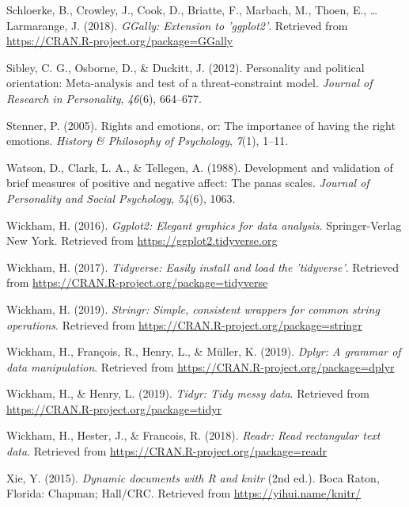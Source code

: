 \documentclass[man]{apa6}
\begin{document}
\leavevmode\hypertarget{ref-R-GGally}{}%
Schloerke, B., Crowley, J., Cook, D., Briatte, F., Marbach, M., Thoen, E., \ldots{} Larmarange, J. (2018). \emph{GGally: Extension to 'ggplot2'}. Retrieved from \url{https://CRAN.R-project.org/package=GGally}

\leavevmode\hypertarget{ref-sibley2012personality}{}%
Sibley, C. G., Osborne, D., \& Duckitt, J. (2012). Personality and political orientation: Meta-analysis and test of a threat-constraint model. \emph{Journal of Research in Personality}, \emph{46}(6), 664--677.

\leavevmode\hypertarget{ref-stenner2005rights}{}%
Stenner, P. (2005). Rights and emotions, or: The importance of having the right emotions. \emph{History \& Philosophy of Psychology}, \emph{7}(1), 1--11.

\leavevmode\hypertarget{ref-watson1988development}{}%
Watson, D., Clark, L. A., \& Tellegen, A. (1988). Development and validation of brief measures of positive and negative affect: The panas scales. \emph{Journal of Personality and Social Psychology}, \emph{54}(6), 1063.

\leavevmode\hypertarget{ref-R-ggplot2}{}%
Wickham, H. (2016). \emph{Ggplot2: Elegant graphics for data analysis}. Springer-Verlag New York. Retrieved from \url{https://ggplot2.tidyverse.org}

\leavevmode\hypertarget{ref-R-tidyverse}{}%
Wickham, H. (2017). \emph{Tidyverse: Easily install and load the 'tidyverse'}. Retrieved from \url{https://CRAN.R-project.org/package=tidyverse}

\leavevmode\hypertarget{ref-R-stringr}{}%
Wickham, H. (2019). \emph{Stringr: Simple, consistent wrappers for common string operations}. Retrieved from \url{https://CRAN.R-project.org/package=stringr}

\leavevmode\hypertarget{ref-R-dplyr}{}%
Wickham, H., François, R., Henry, L., \& Müller, K. (2019). \emph{Dplyr: A grammar of data manipulation}. Retrieved from \url{https://CRAN.R-project.org/package=dplyr}

\leavevmode\hypertarget{ref-R-tidyr}{}%
Wickham, H., \& Henry, L. (2019). \emph{Tidyr: Tidy messy data}. Retrieved from \url{https://CRAN.R-project.org/package=tidyr}

\leavevmode\hypertarget{ref-R-readr}{}%
Wickham, H., Hester, J., \& Francois, R. (2018). \emph{Readr: Read rectangular text data}. Retrieved from \url{https://CRAN.R-project.org/package=readr}

\leavevmode\hypertarget{ref-R-knitr}{}%
Xie, Y. (2015). \emph{Dynamic documents with R and knitr} (2nd ed.). Boca Raton, Florida: Chapman; Hall/CRC. Retrieved from \url{https://yihui.name/knitr/}
\end{document}
